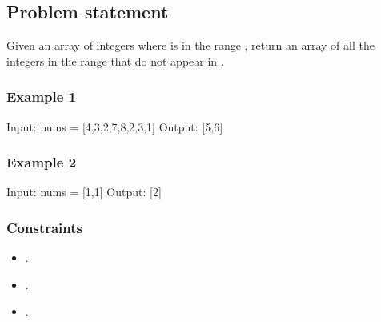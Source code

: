 \documentclass[letterpaper,12pt,english]{book}
\begin{document}
\subsection{Problem statement\sphinxfootnotemark[5]}
\label{\detokenize{Array/01_ARR_448_Find_All_Numbers_Disappeared_in_an_Array:problem-statement}}%
\begin{footnotetext}[5]\sphinxAtStartFootnote
{}
%
\end{footnotetext}\ignorespaces 
\sphinxAtStartPar
Given an array  of  integers where  is in the range \sphinxcode{\sphinxupquote{{[}1, n{]}}}, return an array of all the integers in the range \sphinxcode{\sphinxupquote{{[}1, n{]}}} that do not appear in .


\subsubsection{Example 1}
\label{\detokenize{Array/01_ARR_448_Find_All_Numbers_Disappeared_in_an_Array:example-1}}
\begin{sphinxVerbatim}[commandchars=\\\{\}]
Input: nums = [4,3,2,7,8,2,3,1]
Output: [5,6]
\end{sphinxVerbatim}


\subsubsection{Example 2}
\label{\detokenize{Array/01_ARR_448_Find_All_Numbers_Disappeared_in_an_Array:example-2}}
\begin{sphinxVerbatim}[commandchars=\\\{\}]
Input: nums = [1,1]
Output: [2]
\end{sphinxVerbatim}


\subsubsection{Constraints}
\label{\detokenize{Array/01_ARR_448_Find_All_Numbers_Disappeared_in_an_Array:constraints}}\begin{itemize}
\item {} 
\sphinxAtStartPar
{}.

\item {} 
\sphinxAtStartPar
{}.

\item {} 
\sphinxAtStartPar
{}.

\end{itemize}
\end{document}
